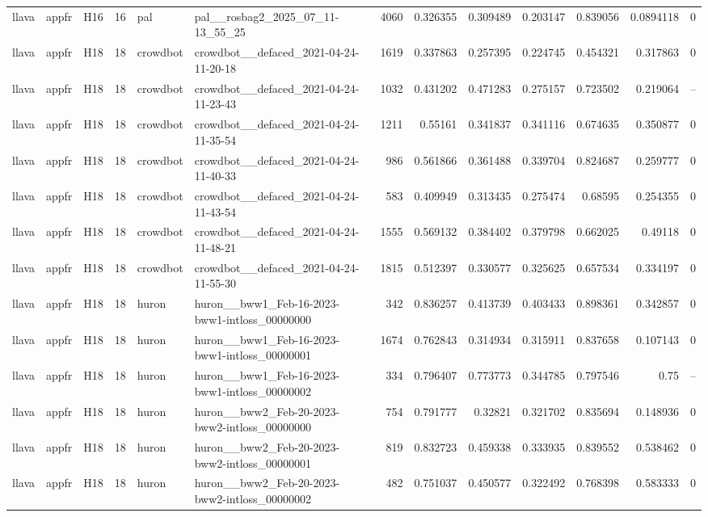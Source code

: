 \begin{longtable}{lllrllrrrrrrr}
llava & appfr & H16 & 16 & pal & pal\_\_rosbag2\_2025\_07\_11-13\_55\_25 & 4060 & 0.326355 & 0.309489 & 0.203147 & 0.839056 & 0.0894118 & 0 \\
llava & appfr & H18 & 18 & crowdbot & crowdbot\_\_defaced\_2021-04-24-11-20-18 & 1619 & 0.337863 & 0.257395 & 0.224745 & 0.454321 & 0.317863 & 0 \\
llava & appfr & H18 & 18 & crowdbot & crowdbot\_\_defaced\_2021-04-24-11-23-43 & 1032 & 0.431202 & 0.471283 & 0.275157 & 0.723502 & 0.219064 & -- \\
llava & appfr & H18 & 18 & crowdbot & crowdbot\_\_defaced\_2021-04-24-11-35-54 & 1211 & 0.55161 & 0.341837 & 0.341116 & 0.674635 & 0.350877 & 0 \\
llava & appfr & H18 & 18 & crowdbot & crowdbot\_\_defaced\_2021-04-24-11-40-33 & 986 & 0.561866 & 0.361488 & 0.339704 & 0.824687 & 0.259777 & 0 \\
llava & appfr & H18 & 18 & crowdbot & crowdbot\_\_defaced\_2021-04-24-11-43-54 & 583 & 0.409949 & 0.313435 & 0.275474 & 0.68595 & 0.254355 & 0 \\
llava & appfr & H18 & 18 & crowdbot & crowdbot\_\_defaced\_2021-04-24-11-48-21 & 1555 & 0.569132 & 0.384402 & 0.379798 & 0.662025 & 0.49118 & 0 \\
llava & appfr & H18 & 18 & crowdbot & crowdbot\_\_defaced\_2021-04-24-11-55-30 & 1815 & 0.512397 & 0.330577 & 0.325625 & 0.657534 & 0.334197 & 0 \\
llava & appfr & H18 & 18 & huron & huron\_\_bww1\_Feb-16-2023-bww1-intloss\_00000000 & 342 & 0.836257 & 0.413739 & 0.403433 & 0.898361 & 0.342857 & 0 \\
llava & appfr & H18 & 18 & huron & huron\_\_bww1\_Feb-16-2023-bww1-intloss\_00000001 & 1674 & 0.762843 & 0.314934 & 0.315911 & 0.837658 & 0.107143 & 0 \\
llava & appfr & H18 & 18 & huron & huron\_\_bww1\_Feb-16-2023-bww1-intloss\_00000002 & 334 & 0.796407 & 0.773773 & 0.344785 & 0.797546 & 0.75 & -- \\
llava & appfr & H18 & 18 & huron & huron\_\_bww2\_Feb-20-2023-bww2-intloss\_00000000 & 754 & 0.791777 & 0.32821 & 0.321702 & 0.835694 & 0.148936 & 0 \\
llava & appfr & H18 & 18 & huron & huron\_\_bww2\_Feb-20-2023-bww2-intloss\_00000001 & 819 & 0.832723 & 0.459338 & 0.333935 & 0.839552 & 0.538462 & 0 \\
llava & appfr & H18 & 18 & huron & huron\_\_bww2\_Feb-20-2023-bww2-intloss\_00000002 & 482 & 0.751037 & 0.450577 & 0.322492 & 0.768398 & 0.583333 & 0 \\

\end{longtable}
